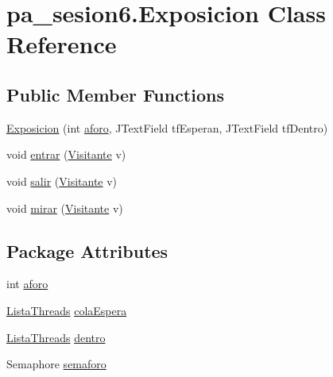 \hypertarget{classpa__sesion6_1_1_exposicion}{}\section{pa\+\_\+sesion6.\+Exposicion Class Reference}
\label{classpa__sesion6_1_1_exposicion}
\subsection*{Public Member Functions}
\begin{DoxyCompactItemize}
\item 
\mbox{\hyperlink{classpa__sesion6_1_1_exposicion_ac2ed6ee34e37947b14312bf2cd826478}{Exposicion}} (int \mbox{\hyperlink{classpa__sesion6_1_1_exposicion_afcbdc68d946761e186c8403f72a868f5}{aforo}}, J\+Text\+Field tf\+Esperan, J\+Text\+Field tf\+Dentro)
\item 
void \mbox{\hyperlink{classpa__sesion6_1_1_exposicion_a290de0143a4ac3d4144b59da8998590f}{entrar}} (\mbox{\hyperlink{classpa__sesion6_1_1_visitante}{Visitante}} v)
\item 
void \mbox{\hyperlink{classpa__sesion6_1_1_exposicion_af3dad6816f86cb8fccc96b5347820a8d}{salir}} (\mbox{\hyperlink{classpa__sesion6_1_1_visitante}{Visitante}} v)
\item 
void \mbox{\hyperlink{classpa__sesion6_1_1_exposicion_a88cad59e332e16a6a199ca599d70239f}{mirar}} (\mbox{\hyperlink{classpa__sesion6_1_1_visitante}{Visitante}} v)
\end{DoxyCompactItemize}
\subsection*{Package Attributes}
\begin{DoxyCompactItemize}
\item 
int \mbox{\hyperlink{classpa__sesion6_1_1_exposicion_afcbdc68d946761e186c8403f72a868f5}{aforo}}
\item 
\mbox{\hyperlink{classpa__sesion6_1_1_lista_threads}{Lista\+Threads}} \mbox{\hyperlink{classpa__sesion6_1_1_exposicion_a3bf69f7216a0de4d66e64da055479f16}{cola\+Espera}}
\item 
\mbox{\hyperlink{classpa__sesion6_1_1_lista_threads}{Lista\+Threads}} \mbox{\hyperlink{classpa__sesion6_1_1_exposicion_ab6a124ffce7020f2703c668f813c557a}{dentro}}
\item 
Semaphore \mbox{\hyperlink{classpa__sesion6_1_1_exposicion_a85f365853b70ab8959d994128fd1b30a}{semaforo}}
\end{DoxyCompactItemize}


